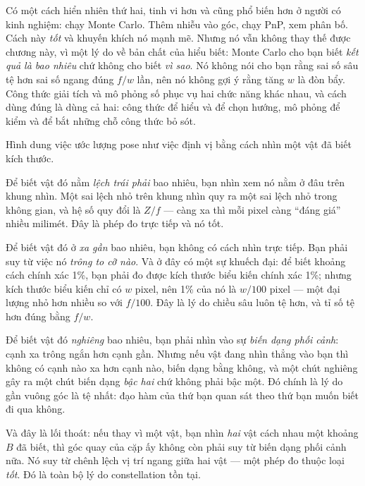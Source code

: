 \documentclass[../../marker.tex]{subfiles}
\begin{document}
Có một cách hiển nhiên thứ hai, tinh vi hơn và cũng phổ biến hơn ở người có kinh nghiệm: chạy Monte Carlo. Thêm nhiễu vào góc, chạy PnP, xem phân bố. Cách này \emph{tốt} và  khuyến khích nó mạnh mẽ. Nhưng nó vẫn không thay thế được chương này, vì một lý do về bản chất của hiểu biết: Monte Carlo cho bạn biết \emph{kết quả là bao nhiêu} chứ không cho biết \emph{vì sao}. Nó không nói cho bạn rằng sai số sâu tệ hơn sai số ngang đúng \(f/w\) lần, nên nó không gợi ý rằng tăng \(w\) là đòn bẩy. Công thức giải tích và mô phỏng số phục vụ hai chức năng khác nhau, và cách dùng đúng là dùng cả hai: công thức để hiểu và để chọn hướng, mô phỏng để kiểm và để bắt những chỗ công thức bỏ sót.

\begin{trucgiac}
Hình dung việc ước lượng pose như việc định vị bằng cách nhìn một vật đã biết kích thước.

Để biết vật đó nằm \emph{lệch trái phải} bao nhiêu, bạn nhìn xem nó nằm ở đâu trên khung nhìn. Một sai lệch nhỏ trên khung nhìn quy ra một sai lệch nhỏ trong không gian, và hệ số quy đổi là \(Z/f\) --- càng xa thì mỗi pixel càng ``đáng giá'' nhiều milimét. Đây là phép đo trực tiếp và nó tốt.

Để biết vật đó ở \emph{xa gần} bao nhiêu, bạn không có cách nhìn trực tiếp. Bạn phải suy từ việc nó \emph{trông to cỡ nào}. Và ở đây có một sự khuếch đại: để biết khoảng cách chính xác 1\%, bạn phải đo được kích thước biểu kiến chính xác 1\%; nhưng kích thước biểu kiến chỉ có \(w\) pixel, nên 1\% của nó là \(w/100\) pixel --- một đại lượng nhỏ hơn nhiều so với \(f/100\). Đây là lý do chiều sâu luôn tệ hơn, và tỉ số tệ hơn đúng bằng \(f/w\).

Để biết vật đó \emph{nghiêng} bao nhiêu, bạn phải nhìn vào sự \emph{biến dạng phối cảnh}: cạnh xa trông ngắn hơn cạnh gần. Nhưng nếu vật đang nhìn thẳng vào bạn thì không có cạnh nào xa hơn cạnh nào, biến dạng bằng không, và một chút nghiêng gây ra một chút biến dạng \emph{bậc hai} chứ không phải bậc một. Đó chính là lý do gần vuông góc là tệ nhất: đạo hàm của thứ bạn quan sát theo thứ bạn muốn biết đi qua không.

Và đây là lối thoát: nếu thay vì một vật, bạn nhìn \emph{hai} vật cách nhau một khoảng \(B\) đã biết, thì góc quay của cặp ấy không còn phải suy từ biến dạng phối cảnh nữa. Nó suy từ chênh lệch vị trí ngang giữa hai vật --- một phép đo thuộc loại \emph{tốt}. Đó là toàn bộ lý do constellation tồn tại.
\end{trucgiac}
\end{document}

